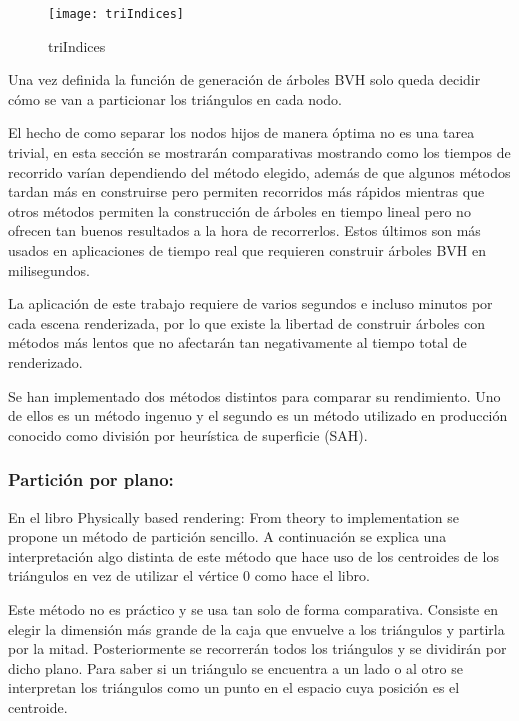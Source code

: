\begin{figure}[H]
    \centering
	\texttt{[image: triIndices]}
	\caption{triIndices}
	\label{fig:label}
\end{figure}

Una vez definida la función de generación de árboles BVH solo queda decidir cómo se van a particionar los triángulos en cada nodo.

El hecho de como separar los nodos hijos de manera óptima no es una tarea trivial, en esta sección se mostrarán comparativas mostrando como los tiempos de recorrido varían dependiendo del método elegido, además de que algunos métodos tardan más en construirse pero permiten recorridos más rápidos mientras que otros métodos permiten la construcción de árboles en tiempo lineal pero no ofrecen tan buenos resultados a la hora de recorrerlos. Estos últimos son más usados en aplicaciones de tiempo real que requieren construir árboles BVH en milisegundos.

La aplicación de este trabajo requiere de varios segundos e incluso minutos por cada escena renderizada, por lo que existe la libertad de construir árboles con métodos más lentos que no afectarán tan negativamente al tiempo total de renderizado.

Se han implementado dos métodos distintos para comparar su rendimiento. Uno de ellos es un método ingenuo y el segundo es un método utilizado en producción conocido como división por heurística de superficie (SAH).

\subsubsection{Partición por plano:}

En el libro Physically based rendering: From theory to implementation \cite{pharr2016physically} se propone un método de partición sencillo. A continuación se explica una interpretación algo distinta de este método que hace uso de los centroides de los triángulos en vez de utilizar el vértice 0 como hace el libro.

Este método no es práctico y se usa tan solo de forma comparativa. Consiste en elegir la dimensión más grande de la caja que envuelve a los triángulos y partirla por la mitad. Posteriormente se recorrerán todos los triángulos y se dividirán por dicho plano. Para saber si un triángulo se encuentra a un lado o al otro se interpretan los triángulos como un punto en el espacio cuya posición es el centroide.

